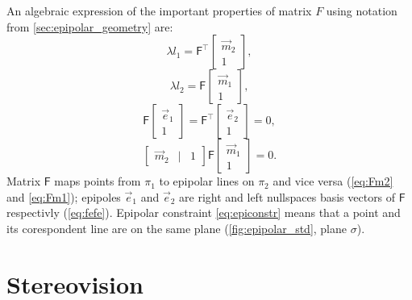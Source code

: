 An algebraic expression of the important properties of matrix $F$ using notation from \autoref{sec:epipolar_geometry} are:
\begin{equation}
    \label{eq:Fm2}
    \lambda l_1 = \pmb{\mathsf{F}}^\top \begin{bmatrix} \vec{m}_2 \\ 1 \end{bmatrix},
\end{equation}
\begin{equation}
    \label{eq:Fm1}
    \lambda l_2 = \pmb{\mathsf{F}} \begin{bmatrix} \vec{m}_1 \\ 1 \end{bmatrix},
\end{equation}
\begin{equation}
    \label{eq:fefe}
    \pmb{\mathsf{F}} \begin{bmatrix} \vec{e}_1 \\ 1 \end{bmatrix} = \pmb{\mathsf{F}}^\top \begin{bmatrix} \vec{e}_2 \\ 1 \end{bmatrix} = 0,
\end{equation}
\begin{equation}
    \label{eq:epiconstr}
    \begin{bmatrix} \vec{m}_2 & | & 1 \end{bmatrix} \pmb{\mathsf{F}} \begin{bmatrix} \vec{m}_1 \\ 1 \end{bmatrix} = 0.
\end{equation}
Matrix $\pmb{\mathsf{F}}$ maps points from $\pi_1$ to epipolar lines on $\pi_2$ and vice versa (\eqref{eq:Fm2} and \eqref{eq:Fm1}); epipoles $\vec{e}_1$ and $\vec{e}_2$ are right and left nullspaces basis vectors of $\pmb{\mathsf{F}}$ respectivly (\eqref{eq:fefe}).
Epipolar constraint \eqref{eq:epiconstr} means that a point and its corespondent line are on the same plane (\eqref{fig:epipolar_std}, plane $\sigma$).

\section{Stereovision}

